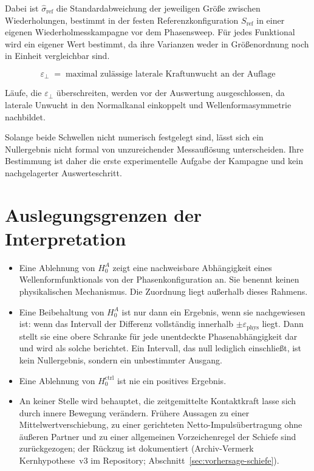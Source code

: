 \documentclass[12pt,a4paper]{report}
\begin{document}
Dabei ist $\hat{\sigma}_{\mathrm{ref}}$ die Standardabweichung der
jeweiligen Größe zwischen Wiederholungen, bestimmt in der festen
Referenzkonfiguration $S_{\mathrm{ref}}$ in einer eigenen
Wiederholmesskampagne vor dem Phasensweep. Für jedes Funktional wird ein
eigener Wert bestimmt, da ihre Varianzen weder in Größenordnung noch in
Einheit vergleichbar sind.

\begin{equation}
  \varepsilon_{\perp} \;=\;
  \text{maximal zulässige laterale Kraftunwucht an der Auflage}
  \label{eq:eps-perp}
\end{equation}

Läufe, die $\varepsilon_{\perp}$ überschreiten, werden vor der Auswertung
ausgeschlossen, da laterale Unwucht in den Normalkanal einkoppelt und
Wellenformasymmetrie nachbildet.

Solange beide Schwellen nicht numerisch festgelegt sind, lässt sich ein
Nullergebnis nicht formal von unzureichender Messauflösung unterscheiden.
Ihre Bestimmung ist daher die erste experimentelle Aufgabe der Kampagne
und kein nachgelagerter Auswerteschritt.

\section{Auslegungsgrenzen der Interpretation}

\begin{itemize}
  \item Eine Ablehnung von $H_{0}^{A}$ zeigt eine nachweisbare
        Abhängigkeit eines Wellenformfunktionals von der
        Phasenkonfiguration an. Sie benennt keinen physikalischen
        Mechanismus. Die Zuordnung liegt außerhalb dieses Rahmens.
  \item Eine Beibehaltung von $H_{0}^{A}$ ist nur dann ein Ergebnis,
        wenn sie nachgewiesen ist: wenn das Intervall der Differenz
        vollständig innerhalb $\pm\varepsilon_{\mathrm{phys}}$ liegt.
        Dann stellt sie eine obere Schranke für jede unentdeckte
        Phasenabhängigkeit dar und wird als solche berichtet. Ein
        Intervall, das null lediglich einschließt, ist kein
        Nullergebnis, sondern ein unbestimmter Ausgang.
  \item Eine Ablehnung von $H_{0}^{\mathrm{ctrl}}$ ist nie ein positives
        Ergebnis.
  \item An keiner Stelle wird behauptet, die zeitgemittelte Kontaktkraft
        lasse sich durch innere Bewegung verändern. Frühere Aussagen zu
        einer Mittelwertverschiebung, zu einer gerichteten
        Netto-Impulsübertragung ohne äußeren Partner und zu einer
        allgemeinen Vorzeichenregel der Schiefe sind zurückgezogen; der
        Rückzug ist dokumentiert (Archiv-Vermerk Kernhypothese~v3 im
        Repository; Abschnitt~\ref{sec:vorhersage-schiefe}).
\end{itemize}
\end{document}
